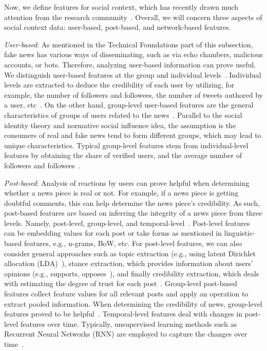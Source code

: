 Now, we define features for social context, which has recently drawn much attention from the research community~\parencite{BeyondNewsContents_Shu, HierarchicalPropagationNetworksForFND_Shu}. Overall, we will concern three aspects of social context data: user-based, post-based, and network-based features.
\begin{description}
    \item{\emph{User-based}:} As mentioned in the Technical Foundations part of this subsection, fake news has various ways of disseminating, such as via echo chambers, malicious accounts, or bots. Therefore, analyzing user-based information can prove useful. We distinguish user-based features at the group and individual levels~\parencite{FakeNewsDetectionOnSocialMediaADataMiningPerspective_Shu}. Individual levels are extracted to deduce the credibility of each user by utilizing, for example, the number of followers and followees, the number of tweets authored by a user, etc~\parencite{InformationCredibilityOnTwiter_Castillo}. On the other hand, group-level user-based features are the general characteristics of groups of users related to the news~\parencite{AutomaticDetectionOfRumor_Yang}. Parallel to the social identity theory and normative social influence idea, the assumption is the consumers of real and fake news tend to form different groups, which may lead to unique characteristics. Typical group-level features stem from individual-level features by obtaining the share of verified users, and the average number of followers and followees~\parencite{DetectRumorsUsingTimeSeries_Ma}.
    \item{\emph{Post-based}:} Analysis of reactions by users can prove helpful when determining whether a news piece is real or not. For example, if a news piece is getting doubtful comments, this can help determine the news piece’s credibility. As such, post-based features are based on inferring the integrity of a news piece from three levels. Namely, post-level, group-level, and temporal-level~\parencite{FakeNewsDetectionOnSocialMediaADataMiningPerspective_Shu}. Post-level features can be embedding values for each post or take forms as mentioned in linguistic-based features, e.g., n-grams, BoW, etc. For post-level features, we can also consider general approaches such as topic extraction (e.g., using latent Dirichlet allocation (LDA)~\parencite{LatentDirichletAllocation_Blei}), stance extraction, which provides information about users’ opinions (e.g., supports, opposes~\parencite{NewsVerificationByExploitingConflictingSocialViewpoints_Jin}), and finally credibility extraction, which deals with estimating the degree of trust for each post~\parencite{InformationCredibilityOnTwiter_Castillo}. Group-level post-based features collect feature values for all relevant posts and apply an operation to extract pooled information. When determining the credibility of news, group-level features proved to be helpful~\parencite{NewsVerificationByExploitingConflictingSocialViewpoints_Jin}. Temporal-level features deal with changes in post-level features over time. Typically, unsupervised learning methods such as Recurrent Neural Networks (RNN) are employed to capture the changes over time~\parencite{DetectingRumorsFromMicroblogs_Ma}.

\end{description}
